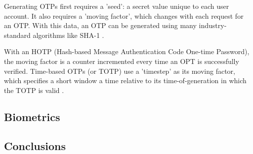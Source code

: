 Generating OTPs first requires a 'seed': a secret value
unique to each user account.
It also requires a 'moving factor', which changes with each
request for an OTP.
With this data, an OTP can be generated using many
industry-standard algorithms like SHA-1
\parencite{whatIsOtp}.

With an HOTP (Hash-based Message Authentication Code
One-time Password), the moving factor is a counter
incremented every time an OPT is successfully verified.
Time-based OTPs (or TOTP) use a 'timestep' as its moving
factor, which specifies a short window a time relative to
its time-of-generation in which the TOTP is valid
\parencite{whatIsOtp}.

\subsection{Biometrics}

\subsection{Conclusions}

